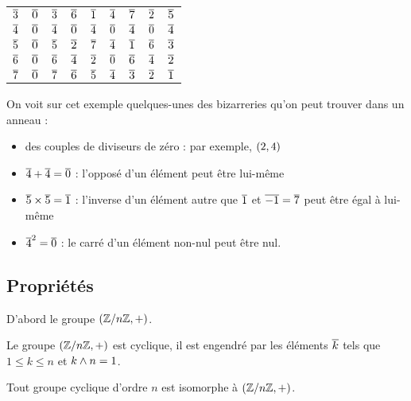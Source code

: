 \begin{center}
\begin{tabular}{|c|cccccccc|}
\(\overline{3}\) & \(\overline{0}\) & \(\overline{3}\) & \(\overline{6}\) & \(\overline{1}\) & \(\overline{4}\) & \(\overline{7}\) & \(\overline{2}\) & \(\overline{5}\) \\
\(\overline{4}\) & \(\overline{0}\) & \(\overline{4}\) & \(\overline{0}\) & \(\overline{4}\) & \(\overline{0}\) & \(\overline{4}\) & \(\overline{0}\) & \(\overline{4}\) \\
\(\overline{5}\) & \(\overline{0}\) & \(\overline{5}\) & \(\overline{2}\) & \(\overline{7}\) & \(\overline{4}\) & \(\overline{1}\) & \(\overline{6}\) & \(\overline{3}\) \\
\(\overline{6}\) & \(\overline{0}\) & \(\overline{6}\) & \(\overline{4}\) & \(\overline{2}\) & \(\overline{0}\) & \(\overline{6}\) & \(\overline{4}\) & \(\overline{2}\) \\
\(\overline{7}\) & \(\overline{0}\) & \(\overline{7}\) & \(\overline{6}\) & \(\overline{5}\) & \(\overline{4}\) & \(\overline{3}\) & \(\overline{2}\) & \(\overline{1}\) \\
\hline
\end{tabular}
\end{center}

On voit sur cet exemple quelques-unes des bizarreries qu'on peut trouver dans un anneau :

\begin{itemize}
    \item des couples de diviseurs de zéro : par exemple, \(\left(2,4\right)\) \\
    \item \(\overline{4}+\overline{4}=\overline{0}\) : l'opposé d'un élément peut être lui-même \\
    \item \(\overline{5}\times\overline{5}=\overline{1}\) : l'inverse d'un élément autre que \(\overline{1}\) et \(\overline{-1}=\overline{7}\) peut être égal à lui-même \\
    \item \(\overline{4}^2=\overline{0}\) : le carré d'un élément non-nul peut être nul.
\end{itemize}

\subsection{Propriétés}

D'abord le groupe \(\groupe{\znz{n}}[+]\).

\begin{prop}
Le groupe \(\groupe{\znz{n}}[+]\) est cyclique, il est engendré par les éléments \(\overline{k}\) tels que \(1\leq k\leq n\) et \(k\land n=1\).

Tout groupe cyclique d'ordre \(n\) est isomorphe à \(\groupe{\znz{n}}[+]\).
\end{prop}

